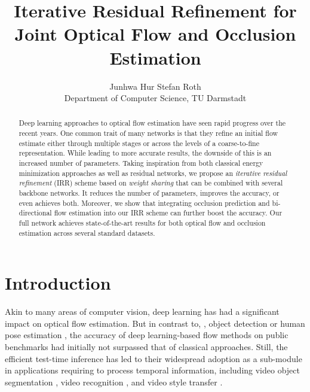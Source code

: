 \documentclass[10pt,twocolumn,letterpaper]{article}
\begin{document}
\title{Iterative Residual Refinement for Joint Optical Flow and Occlusion Estimation}

\author{Junhwa Hur \qquad\qquad Stefan Roth \\
Department of Computer Science, TU Darmstadt}

\maketitle
\thispagestyle{fancy} 

\begin{abstract}
	Deep learning approaches to optical flow estimation have seen rapid progress over the recent years.
One common trait of many networks is that they refine an initial flow estimate either through multiple stages or across the levels of a coarse-to-fine representation.
While leading to more accurate results, the downside of this is an increased number of parameters.
Taking inspiration from both classical energy minimization approaches as well as residual networks, we propose an \emph{iterative residual refinement} (IRR) scheme based on \emph{weight sharing} that can be combined with several backbone networks.
It reduces the number of parameters, improves the accuracy, or even achieves both.
Moreover, we show that integrating occlusion prediction and bi-directional flow estimation into our IRR scheme can further boost the accuracy.
Our full network achieves state-of-the-art results for both optical flow and occlusion estimation across several standard datasets. \end{abstract}



\section{Introduction}
\label{sec:introduction}



Akin to many areas of computer vision, deep learning has had a significant impact on optical flow estimation.
But in contrast to, \eg, object detection \cite{Girshick:2016:RBC} or human pose estimation \cite{Tompson:2014:JTC}, the accuracy of deep learning-based flow methods on public benchmarks \cite{Butler:2012:NOS,Geiger:2012:AWR,Menze:2015:OSF} had initially not surpassed that of classical approaches.
Still, the efficient test-time inference has led to their widespread adoption as a sub-module in applications requiring to process temporal information, including video object segmentation \cite{Cheng:2017:SFJ}, video recognition \cite{Gadde:2017:SVC,Nilsson:2018:SVS,Zhu:2017:DFF}, and video style transfer \cite{Chen:2017:COV}.
\end{document}
